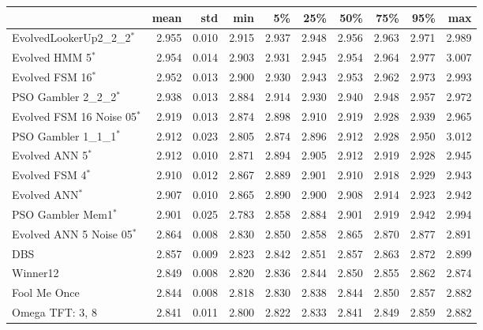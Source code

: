 \begin{tabular}{lrrrrrrrrr}
\toprule
{} &   mean &    std &    min &     5\% &    25\% &    50\% &    75\% &    95\% &    max \\
\midrule
EvolvedLookerUp2\_2\_2$^{*}$    &  2.955 &  0.010 &  2.915 &  2.937 &  2.948 &  2.956 &  2.963 &  2.971 &  2.989 \\
Evolved HMM 5$^{*}$           &  2.954 &  0.014 &  2.903 &  2.931 &  2.945 &  2.954 &  2.964 &  2.977 &  3.007 \\
Evolved FSM 16$^{*}$          &  2.952 &  0.013 &  2.900 &  2.930 &  2.943 &  2.953 &  2.962 &  2.973 &  2.993 \\
PSO Gambler 2\_2\_2$^{*}$       &  2.938 &  0.013 &  2.884 &  2.914 &  2.930 &  2.940 &  2.948 &  2.957 &  2.972 \\
Evolved FSM 16 Noise 05$^{*}$ &  2.919 &  0.013 &  2.874 &  2.898 &  2.910 &  2.919 &  2.928 &  2.939 &  2.965 \\
PSO Gambler 1\_1\_1$^{*}$       &  2.912 &  0.023 &  2.805 &  2.874 &  2.896 &  2.912 &  2.928 &  2.950 &  3.012 \\
Evolved ANN 5$^{*}$           &  2.912 &  0.010 &  2.871 &  2.894 &  2.905 &  2.912 &  2.919 &  2.928 &  2.945 \\
Evolved FSM 4$^{*}$           &  2.910 &  0.012 &  2.867 &  2.889 &  2.901 &  2.910 &  2.918 &  2.929 &  2.943 \\
Evolved ANN$^{*}$             &  2.907 &  0.010 &  2.865 &  2.890 &  2.900 &  2.908 &  2.914 &  2.923 &  2.942 \\
PSO Gambler Mem1$^{*}$        &  2.901 &  0.025 &  2.783 &  2.858 &  2.884 &  2.901 &  2.919 &  2.942 &  2.994 \\
Evolved ANN 5 Noise 05$^{*}$  &  2.864 &  0.008 &  2.830 &  2.850 &  2.858 &  2.865 &  2.870 &  2.877 &  2.891 \\
DBS                           &  2.857 &  0.009 &  2.823 &  2.842 &  2.851 &  2.857 &  2.863 &  2.872 &  2.899 \\
Winner12                      &  2.849 &  0.008 &  2.820 &  2.836 &  2.844 &  2.850 &  2.855 &  2.862 &  2.874 \\
Fool Me Once                  &  2.844 &  0.008 &  2.818 &  2.830 &  2.838 &  2.844 &  2.850 &  2.857 &  2.882 \\
Omega TFT: 3, 8               &  2.841 &  0.011 &  2.800 &  2.822 &  2.833 &  2.841 &  2.849 &  2.859 &  2.882 \\
\bottomrule
\end{tabular}
